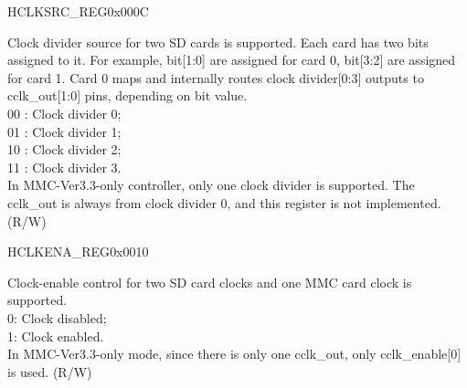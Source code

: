 \begin{register}{H}{CLKSRC\_REG}{0x000C}\label{regdesc:CLKSRCREG}
%
%
\regnewline%
\begin{regdesc}\begin{reglist}
\item [CLKSRC\_REG]Clock divider source for two SD cards is supported. Each card has two bits assigned to it. For example, bit[1:0] are assigned for card 0, bit[3:2] are assigned for card 1. Card 0 maps and internally routes clock divider[0:3] outputs to cclk\_out[1:0] pins, depending on bit value.\\
00 : Clock divider 0;\\
01 : Clock divider 1;\\
10 : Clock divider 2;\\
11 : Clock divider 3.\\
In MMC-Ver3.3-only controller, only one clock divider is supported. The cclk\_out is always from clock divider 0, and this register is not implemented. (R/W)
\end{reglist}\end{regdesc}
\end{register}


\begin{register}{H}{CLKENA\_REG}{0x0010}\label{regdesc:CLKENAREG}
%
%
\regnewline%
\begin{regdesc}\begin{reglist}
\item [CCLK\_ENABEL]Clock-enable control for two SD card clocks and one MMC card clock is supported.\\
0: Clock disabled;\\
1: Clock enabled.\\
In MMC-Ver3.3-only mode, since there is only one cclk\_out, only cclk\_enable[0] is used. (R/W)
\end{reglist}\end{regdesc}
\end{register}


